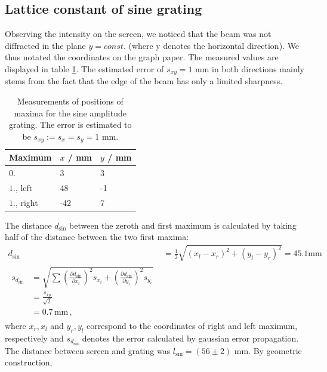 \subsection{Lattice constant of sine grating}
Observing the intensity on the screen, we noticed that the beam was not 
diffracted in the plane $y = const.$ (where y denotes the horizontal direction). 
We thus notated the coordinates on the graph paper. The measured values 
are displayed in table \ref{tab:sine_distances}. The estimated error of 
$s_{xy} = 1$ mm in both directions mainly stems from the fact that the edge of the beam 
has only a limited sharpness. 
\renewcommand{\arraystretch}{1.5}
\begin{table}[htdp]
    \centering
    \begin{tabular}{|p{6.18cm}|p{3.82cm}|p{3.82cm}|}
        \hline
        \rowcolor{LightCyan}
        Maximum & $x$ / mm & $y$  / mm \\ \hline
        $0.$        & 3     & 3\\
        $1.$, left & 48    & -1\\
        $1.$, right  & -42   & 7\\
        \hline
    \end{tabular}
    \caption{
        Measurements of positions of maxima for the sine amplitude grating. 
        The error is estimated to be $s_{xy} := s_x = s_y = 1$ mm. 
        }
    \label{tab:sine_distances}
\end{table}
The distance $d_\mathrm{sin}$ between the zeroth and first maximum is calculated by taking half of 
the distance between the two first maxima:
\begin{align}
    d_\mathrm{sin}   &= \frac{1}{2} \sqrt{(x_l - x_r)^2 + (y_l - y_r)^2} = 45.1 \mathrm{mm} \\
    \begin{split}
        s_{d_\mathrm{sin}} &= \sqrt{\sum{
                \left(\frac{\partial d_\mathrm{sin}}{\partial x_i}\right)^2 s_{x_i}  + 
                \left(\frac{\partial d_\mathrm{sin}}{\partial y_i}\right)^2 s_{y_i} 
                }} \\
        &= \frac{s_{xy}}{\sqrt{2}} \\
        &= 0.7 \, \mathrm{mm}\, ,
    \end{split}
\end{align}
where $x_r, x_l$ and $y_r, y_l$ correspond to the coordinates of right and left 
maximum, respectively and $s_{d_\mathrm{sin}}$ denotes the error calculated by gaussian error propagation.
The distance between screen and grating was $l_\mathrm{sin} = (56 \pm 2)$ mm. By geometric construction, 
